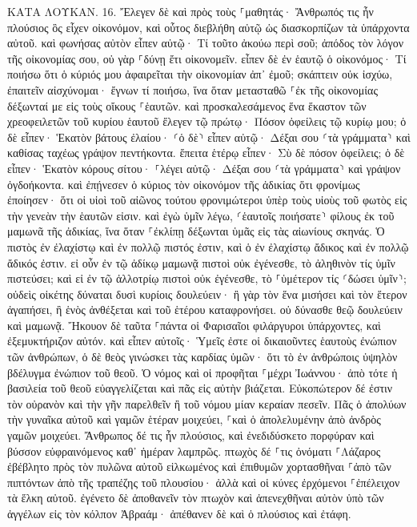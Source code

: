 \documentclass[twoside, 9pt]{extreport}
\begin{document}
ΚΑΤΑ ΛΟΥΚΑΝ.
16.
Ἔλεγεν δὲ καὶ πρὸς τοὺς ⸀μαθητάς· Ἄνθρωπός τις ἦν πλούσιος ὃς εἶχεν οἰκονόμον, καὶ οὗτος διεβλήθη αὐτῷ ὡς διασκορπίζων τὰ ὑπάρχοντα αὐτοῦ. 
καὶ φωνήσας αὐτὸν εἶπεν αὐτῷ· Τί τοῦτο ἀκούω περὶ σοῦ; ἀπόδος τὸν λόγον τῆς οἰκονομίας σου, οὐ γὰρ ⸀δύνῃ ἔτι οἰκονομεῖν. 
εἶπεν δὲ ἐν ἑαυτῷ ὁ οἰκονόμος· Τί ποιήσω ὅτι ὁ κύριός μου ἀφαιρεῖται τὴν οἰκονομίαν ἀπ᾽ ἐμοῦ; σκάπτειν οὐκ ἰσχύω, ἐπαιτεῖν αἰσχύνομαι· 
ἔγνων τί ποιήσω, ἵνα ὅταν μετασταθῶ ⸀ἐκ τῆς οἰκονομίας δέξωνταί με εἰς τοὺς οἴκους ⸀ἑαυτῶν. 
καὶ προσκαλεσάμενος ἕνα ἕκαστον τῶν χρεοφειλετῶν τοῦ κυρίου ἑαυτοῦ ἔλεγεν τῷ πρώτῳ· Πόσον ὀφείλεις τῷ κυρίῳ μου; 
ὁ δὲ εἶπεν· Ἑκατὸν βάτους ἐλαίου· ⸂ὁ δὲ⸃ εἶπεν αὐτῷ· Δέξαι σου ⸂τὰ γράμματα⸃ καὶ καθίσας ταχέως γράψον πεντήκοντα. 
ἔπειτα ἑτέρῳ εἶπεν· Σὺ δὲ πόσον ὀφείλεις; ὁ δὲ εἶπεν· Ἑκατὸν κόρους σίτου· ⸀λέγει αὐτῷ· Δέξαι σου ⸂τὰ γράμματα⸃ καὶ γράψον ὀγδοήκοντα. 
καὶ ἐπῄνεσεν ὁ κύριος τὸν οἰκονόμον τῆς ἀδικίας ὅτι φρονίμως ἐποίησεν· ὅτι οἱ υἱοὶ τοῦ αἰῶνος τούτου φρονιμώτεροι ὑπὲρ τοὺς υἱοὺς τοῦ φωτὸς εἰς τὴν γενεὰν τὴν ἑαυτῶν εἰσιν. 
καὶ ἐγὼ ὑμῖν λέγω, ⸂ἑαυτοῖς ποιήσατε⸃ φίλους ἐκ τοῦ μαμωνᾶ τῆς ἀδικίας, ἵνα ὅταν ⸀ἐκλίπῃ δέξωνται ὑμᾶς εἰς τὰς αἰωνίους σκηνάς. 
Ὁ πιστὸς ἐν ἐλαχίστῳ καὶ ἐν πολλῷ πιστός ἐστιν, καὶ ὁ ἐν ἐλαχίστῳ ἄδικος καὶ ἐν πολλῷ ἄδικός ἐστιν. 
εἰ οὖν ἐν τῷ ἀδίκῳ μαμωνᾷ πιστοὶ οὐκ ἐγένεσθε, τὸ ἀληθινὸν τίς ὑμῖν πιστεύσει; 
καὶ εἰ ἐν τῷ ἀλλοτρίῳ πιστοὶ οὐκ ἐγένεσθε, τὸ ⸀ὑμέτερον τίς ⸂δώσει ὑμῖν⸃; 
οὐδεὶς οἰκέτης δύναται δυσὶ κυρίοις δουλεύειν· ἢ γὰρ τὸν ἕνα μισήσει καὶ τὸν ἕτερον ἀγαπήσει, ἢ ἑνὸς ἀνθέξεται καὶ τοῦ ἑτέρου καταφρονήσει. οὐ δύνασθε θεῷ δουλεύειν καὶ μαμωνᾷ. 
Ἤκουον δὲ ταῦτα ⸀πάντα οἱ Φαρισαῖοι φιλάργυροι ὑπάρχοντες, καὶ ἐξεμυκτήριζον αὐτόν. 
καὶ εἶπεν αὐτοῖς· Ὑμεῖς ἐστε οἱ δικαιοῦντες ἑαυτοὺς ἐνώπιον τῶν ἀνθρώπων, ὁ δὲ θεὸς γινώσκει τὰς καρδίας ὑμῶν· ὅτι τὸ ἐν ἀνθρώποις ὑψηλὸν βδέλυγμα ἐνώπιον τοῦ θεοῦ. 
Ὁ νόμος καὶ οἱ προφῆται ⸀μέχρι Ἰωάννου· ἀπὸ τότε ἡ βασιλεία τοῦ θεοῦ εὐαγγελίζεται καὶ πᾶς εἰς αὐτὴν βιάζεται. 
Εὐκοπώτερον δέ ἐστιν τὸν οὐρανὸν καὶ τὴν γῆν παρελθεῖν ἢ τοῦ νόμου μίαν κεραίαν πεσεῖν. 
Πᾶς ὁ ἀπολύων τὴν γυναῖκα αὐτοῦ καὶ γαμῶν ἑτέραν μοιχεύει, ⸀καὶ ὁ ἀπολελυμένην ἀπὸ ἀνδρὸς γαμῶν μοιχεύει. 
Ἄνθρωπος δέ τις ἦν πλούσιος, καὶ ἐνεδιδύσκετο πορφύραν καὶ βύσσον εὐφραινόμενος καθ᾽ ἡμέραν λαμπρῶς. 
πτωχὸς δέ ⸀τις ὀνόματι ⸀Λάζαρος ἐβέβλητο πρὸς τὸν πυλῶνα αὐτοῦ εἱλκωμένος 
καὶ ἐπιθυμῶν χορτασθῆναι ⸀ἀπὸ τῶν πιπτόντων ἀπὸ τῆς τραπέζης τοῦ πλουσίου· ἀλλὰ καὶ οἱ κύνες ἐρχόμενοι ⸀ἐπέλειχον τὰ ἕλκη αὐτοῦ. 
ἐγένετο δὲ ἀποθανεῖν τὸν πτωχὸν καὶ ἀπενεχθῆναι αὐτὸν ὑπὸ τῶν ἀγγέλων εἰς τὸν κόλπον Ἀβραάμ· ἀπέθανεν δὲ καὶ ὁ πλούσιος καὶ ἐτάφη. 
\end{document}
